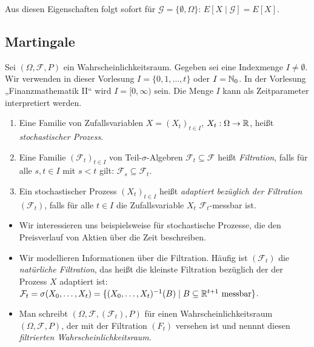 \documentclass[a4paper,twoside,DIV15,BCOR12mm]{scrbook}
\newcommand{\cF}{\mathcal F}
\begin{document}
Aus diesen Eigenschaften folgt sofort für $\mathcal G = \{\emptyset, \Omega\}$: $E[X\mid\mathcal G] = E[X]$.


\subsection{Martingale}

Sei $(\Omega, \cF, P)$ ein Wahrscheinlichkeitsraum. Gegeben sei eine Indexmenge $I\ne \emptyset$. Wir verwenden in dieser Vorlesung $I=\{0,1,\ldots,t\}$ oder $I=\mathbb{N}_0$. In der Vorlesung „Finanzmathematik II“ wird $I=[0,\infty)$ sein. Die Menge $I$ kann als Zeitparameter interpretiert werden.

\begin{definition}
\begin{enumerate}
\item Eine Familie von Zufallsvariablen $X=(X_t)_{t\in I}$, $X_t:\Omega \to \mathbb{R}$, heißt \emph{stochastischer Prozess}.
\item Eine Familie $(\cF_t)_{t\in I}$ von Teil-$\sigma$-Algebren $\cF_t \subseteq \cF$ heißt \emph{Filtration}, falls für alle $s,t\in I$ mit $s<t$ gilt: $\cF_s \subseteq \cF_t$.
\item Ein stochastischer Prozess $(X_t)_{t\in I}$ heißt \emph{adaptiert bezüglich der Filtration $(\cF_t)$},  falls für alle $t\in I$ die Zufallsvariable $X_t$ $\cF_t$-messbar ist.
\end{enumerate}
\end{definition}

\begin{bemerkung}
\begin{itemize}
\item Wir interessieren uns beispielsweise für stochastische Prozesse, die den Preisverlauf von Aktien über die Zeit beschreiben.
\item Wir modellieren Informationen über die Filtration. Häufig ist $(\cF_t)$ die \emph{natürliche Filtration}, das heißt die kleinste Filtration bezüglich der der Prozess $X$ adaptiert ist: $\cF_t = \sigma(X_0,\ldots,X_t) = \{(X_0,\ldots,X_t)^{-1}(B)\mid B\subseteq \MdR^{t+1} \text{ messbar}\}$.
\item Man schreibt $(\Omega, \cF, (\cF_t), P)$ für einen Wahrscheinlichkeitsraum $(\Omega, \cF, P)$, der mit der Filtration $(F_t)$ versehen ist und nennnt diesen \emph{filtrierten Wahrscheinlichkeitsraum}.
\end{itemize}
\end{bemerkung}
\end{document}
